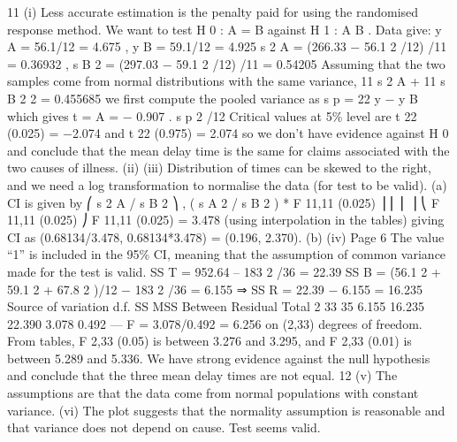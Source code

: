 \documentclass[a4paper,12pt]{article}
\begin{document}
\newpage
11
(i)
Less accurate estimation is the penalty paid for using the randomised
response method.
We want to test H 0 : \mu A = \mu B against H 1 : \mu A \neq\mu B .
Data give: y A = 56.1/12 = 4.675 , y B = 59.1/12 = 4.925
s 2 A = (266.33 − 56.1 2 /12) /11 = 0.36932 ,
s B 2 = (297.03 − 59.1 2 /12) /11 = 0.54205
Assuming that the two samples come from normal distributions with the same
variance,
11 s 2 A + 11 s B 2
2
= 0.455685
we first compute the pooled variance as s p =
22
y − y B
which gives t = A
= − 0.907 .
s p 2 /12
Critical values at 5\% level are t 22 (0.025) = −2.074 and t 22 (0.975) = 2.074
so we don’t have evidence against H 0 and conclude that the mean delay time is the same for claims associated with the two causes of illness.
(ii)
(iii)
Distribution of times can be skewed to the right, and we need a log
transformation to normalise the data (for test to be valid).
(a)
CI is given by
⎛ s 2 A / s B 2
⎞
, ( s A 2 / s B 2 ) * F 11,11 (0.025) ⎟
⎜ ⎜
⎟
⎝ F 11,11 (0.025)
⎠
F 11,11 (0.025) = 3.478 (using interpolation in the tables)
giving CI as (0.68134/3.478, 0.68134*3.478) = (0.196, 2.370).
(b)
(iv)
Page 6
The value “1” is included in the 95\% CI, meaning that the assumption
of common variance made for the test is valid.
SS T = 952.64 – 183 2 /36 = 22.39
SS B = (56.1 2 + 59.1 2 + 67.8 2 )/12 − 183 2 /36 = 6.155
⇒ SS R = 22.39 − 6.155 = 16.235
Source of variation d.f. SS MSS
Between
Residual
Total 2
33
35 6.155
16.235
22.390 3.078
0.492  — %
F = 3.078/0.492 = 6.256 on (2,33) degrees of freedom.
From tables, F 2,33 (0.05) is between 3.276 and 3.295, and F 2,33 (0.01) is
between 5.289 and 5.336.
We have strong evidence against the null hypothesis and conclude that the three mean delay times are not equal.
12
(v) The assumptions are that the data come from normal populations with constant variance.
(vi) The plot suggests that the normality assumption is reasonable and that variance does not depend on cause. Test seems valid.
\end{document}
